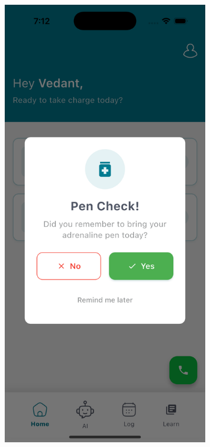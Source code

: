 \documentclass[MScCS]{uccthesis}
\begin{document}
\begin{figure}[htbp]
    \centering
    \begin{minipage}[b]{0.45\textwidth}
        \centering
        \includegraphics[width=0.8\textwidth,height=0.45\textheight,keepaspectratio]{Figures/pen_reminder_dialogue.png}
     

\end{minipage}
\end{figure}
\end{document}
